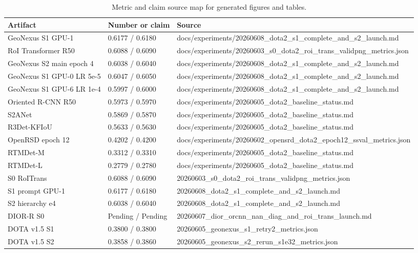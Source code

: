 \begin{table}[t]
\centering
\small
\caption{Metric and claim source map for generated figures and tables.}
\label{tab:artifact_sources}
\begin{tabular}{lll}
\toprule
Artifact & Number or claim & Source \\
\midrule
GeoNexus S1 GPU-1 & 0.6177 / 0.6180 & docs/experiments/20260608\_dota2\_s1\_complete\_and\_s2\_launch.md \\
RoI Transformer R50 & 0.6088 / 0.6090 & docs/experiments/20260603\_s0\_dota2\_roi\_trans\_validpng\_metrics.json \\
GeoNexus S2 main epoch 4 & 0.6038 / 0.6040 & docs/experiments/20260608\_dota2\_s1\_complete\_and\_s2\_launch.md \\
GeoNexus S1 GPU-0 LR 5e-5 & 0.6047 / 0.6050 & docs/experiments/20260608\_dota2\_s1\_complete\_and\_s2\_launch.md \\
GeoNexus S1 GPU-6 LR 1e-4 & 0.5997 / 0.6000 & docs/experiments/20260608\_dota2\_s1\_complete\_and\_s2\_launch.md \\
Oriented R-CNN R50 & 0.5973 / 0.5970 & docs/experiments/20260605\_dota2\_baseline\_status.md \\
S2ANet & 0.5869 / 0.5870 & docs/experiments/20260605\_dota2\_baseline\_status.md \\
R3Det-KFIoU & 0.5633 / 0.5630 & docs/experiments/20260605\_dota2\_baseline\_status.md \\
OpenRSD epoch 12 & 0.4202 / 0.4200 & docs/experiments/20260602\_opensrd\_dota2\_epoch12\_ssval\_metrics.json \\
RTMDet-M & 0.3312 / 0.3310 & docs/experiments/20260605\_dota2\_baseline\_status.md \\
RTMDet-L & 0.2779 / 0.2780 & docs/experiments/20260605\_dota2\_baseline\_status.md \\
S0 RoITrans & 0.6088 / 0.6090 & 20260603\_s0\_dota2\_roi\_trans\_validpng\_metrics.json \\
S1 prompt GPU-1 & 0.6177 / 0.6180 & 20260608\_dota2\_s1\_complete\_and\_s2\_launch.md \\
S2 hierarchy e4 & 0.6038 / 0.6040 & 20260608\_dota2\_s1\_complete\_and\_s2\_launch.md \\
DIOR-R S0 & Pending / Pending & 20260607\_dior\_orcnn\_nan\_diag\_and\_roi\_trans\_launch.md \\
DOTA v1.5 S1 & 0.3800 / 0.3800 & 20260605\_geonexus\_s1\_retry2\_metrics.json \\
DOTA v1.5 S2 & 0.3858 / 0.3860 & 20260605\_geonexus\_s2\_rerun\_s1e32\_metrics.json \\

\end{tabular}
\end{table}
